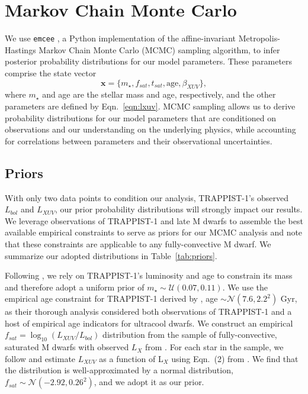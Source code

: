 \documentclass[twocolumn]{aastex62}
\begin{document}

\section{Markov Chain Monte Carlo} \label{sec:mcmc}

We use \texttt{emcee} \citep{ForemanMackey2013}, a Python implementation of the \citet{Goodman2010} affine-invariant Metropolis-Hastings Markov Chain Monte Carlo (MCMC) sampling algorithm, to infer posterior probability distributions for our model parameters. These parameters comprise the state vector
\begin{equation} \label{eqn:state}
    \textbf{x} = \{m_{\star}, f_{sat}, t_{sat}, \mathrm{age}, \beta_{XUV}\},
\end{equation}
where $m_{\star}$ and age are the stellar mass and age, respectively, and the other parameters are defined by Eqn.~\ref{eqn:lxuv}.  MCMC sampling allows us to derive probability distributions for our model parameters that are conditioned on observations and our understanding on the underlying physics, while accounting for correlations between parameters and their observational uncertainties.  

\subsection{Priors} \label{sec:mcmc:priors}

With only two data points to condition our analysis, TRAPPIST-1's observed $L_{bol}$ and $L_{XUV}$, our prior probability distributions will strongly impact our results. We leverage observations of TRAPPIST-1 and late M dwarfs to assemble the best available empirical constraints to serve as priors for our MCMC analysis and note that these constraints are applicable to any fully-convective M dwarf. We summarize our adopted distributions in Table~\ref{tab:priors}.

Following \citet{vanGrootel2018}, we rely on TRAPPIST-1's luminosity and age to constrain its mass and therefore adopt a uniform prior of $m_{\star} \sim \mathcal{U}(0.07, 0.11)$. We use the empirical age constraint for TRAPPIST-1 derived by \citet{Burgasser2017}, age $\sim \mathcal{N}(7.6, 2.2^2)$ Gyr, as their thorough analysis considered both observations of TRAPPIST-1 and a host of empirical age indicators for ultracool dwarfs. We construct an empirical $f_{sat} = \log_{10}(L_{XUV}/L_{bol})$ distribution from the sample of fully-convective, saturated M dwarfs with observed $L_{X}$ from \citet{Wright2011}. For each star in the \citet{Wright2011} sample, we follow \citet{Wheatley2017} and estimate $L_{XUV}$ as a function of L$_{X}$ using Eqn.~(2) from \citet{Chadney2015}. We find that the distribution is well-approximated by a normal distribution, $f_{sat} \sim \mathcal{N}(-2.92, 0.26^2)$, and we adopt it as our prior.  
\end{document}
